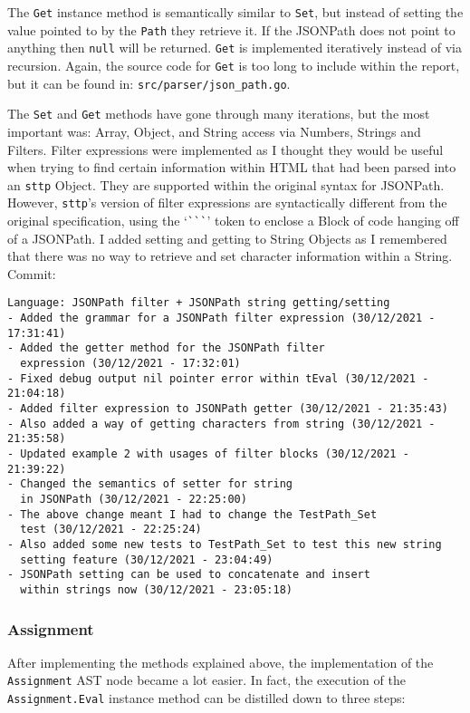 The \verb|Get| instance method is semantically similar to \verb|Set|, but instead of setting the value pointed to by the \verb|Path| they retrieve it. If the JSONPath does not point to anything then \verb|null| will be returned. \verb|Get| is implemented iteratively instead of via recursion. Again, the source code for \verb|Get| is too long to include within the report, but it can be found in: \verb|src/parser/json_path.go|.

The \verb|Set| and \verb|Get| methods have gone through many iterations, but the most important was: Array, Object, and String access via Numbers, Strings and Filters. Filter expressions were implemented as I thought they would be useful when trying to find certain information within HTML that had been parsed into an \verb|sttp| Object. They are supported within the original syntax for JSONPath\textsuperscript{\cite{goessner_2007}}. However, \verb|sttp|'s version of filter expressions are syntactically different from the original specification, using the `\verb|```|' token to enclose a Block of code hanging off of a JSONPath. I added setting and getting to String Objects as I remembered that there was no way to retrieve and set character information within a String. Commit:

\begin{verbatim}
Language: JSONPath filter + JSONPath string getting/setting
- Added the grammar for a JSONPath filter expression (30/12/2021 - 17:31:41)
- Added the getter method for the JSONPath filter
  expression (30/12/2021 - 17:32:01)
- Fixed debug output nil pointer error within tEval (30/12/2021 - 21:04:18)
- Added filter expression to JSONPath getter (30/12/2021 - 21:35:43)
- Also added a way of getting characters from string (30/12/2021 - 21:35:58)
- Updated example 2 with usages of filter blocks (30/12/2021 - 21:39:22)
- Changed the semantics of setter for string
  in JSONPath (30/12/2021 - 22:25:00)
- The above change meant I had to change the TestPath_Set
  test (30/12/2021 - 22:25:24)
- Also added some new tests to TestPath_Set to test this new string
  setting feature (30/12/2021 - 23:04:49)
- JSONPath setting can be used to concatenate and insert
  within strings now (30/12/2021 - 23:05:18)
\end{verbatim}

\subsubsection{Assignment}

After implementing the methods explained above, the implementation of the \verb|Assignment| AST node became a lot easier. In fact, the execution of the \verb|Assignment.Eval| instance method can be distilled down to three steps:


